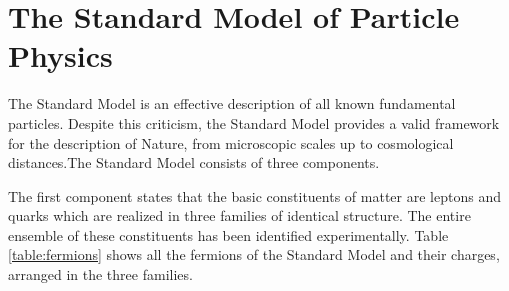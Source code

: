 \section{The Standard Model of Particle Physics}

The Standard Model \cite{Spiesberger:2000ks} is an effective description of all known fundamental particles.  Despite this criticism, the Standard Model provides a valid framework for the description of Nature, from microscopic scales up to cosmological distances.The Standard Model consists of three components.

The first component states that the basic constituents of matter are leptons and quarks which are realized in three families of identical structure. The entire ensemble of these constituents has been identified experimentally. Table \ref{table:fermions} shows all the fermions of the Standard Model and their charges, arranged in the three families.

